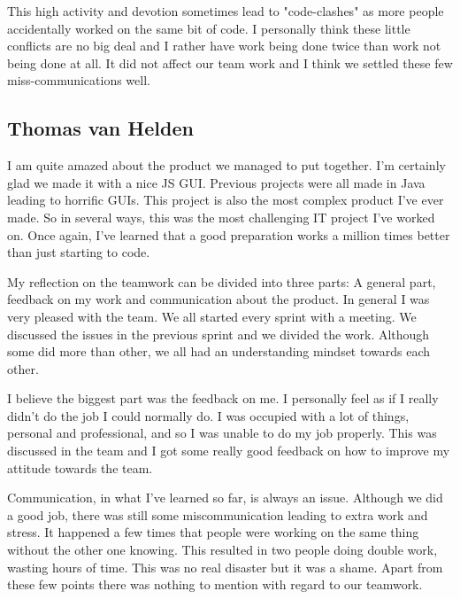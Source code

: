 \documentclass[a4paper]{article}
\begin{document}
This high activity and devotion sometimes lead to "code-clashes" as more people accidentally worked on the same bit of code. I personally think these little conflicts are no big deal and I rather have work being done twice than work not being done at all. It did not affect our team work and I think we settled these few miss-communications well.

\subsection{Thomas van Helden}
I am quite amazed about the product we managed to put together. I'm certainly glad we made it with a nice JS GUI. Previous projects were all made in Java leading to horrific GUIs. This project is also the most complex product I've ever made. So in several ways, this was the most challenging IT project I've worked on. Once again, I've learned that a good preparation works a million times better than just starting to code. 

My reflection on the teamwork can be divided into three parts: A general part, feedback on my work and communication about the product.
In general I was very pleased with the team. We all started every sprint with a meeting. We discussed the issues in the previous sprint and we divided the work. Although some did more than other, we all had an understanding mindset towards each other.

I believe the biggest part was the feedback on me. I personally feel as if I really didn't do the job I could normally do. I was occupied with a lot of things, personal and professional, and so I was unable to do my job properly. This was discussed in the team and I got some really good feedback on how to improve my attitude towards the team. 

Communication, in what I've learned so far, is always an issue. Although we did a good job, there was still some miscommunication leading to extra work and stress. It happened a few times that people were working on the same thing without the other one knowing. This resulted in two people doing double work, wasting hours of time. This was no real disaster but it was a shame. Apart from these few points there was nothing to mention with regard to our teamwork.
\end{document}
